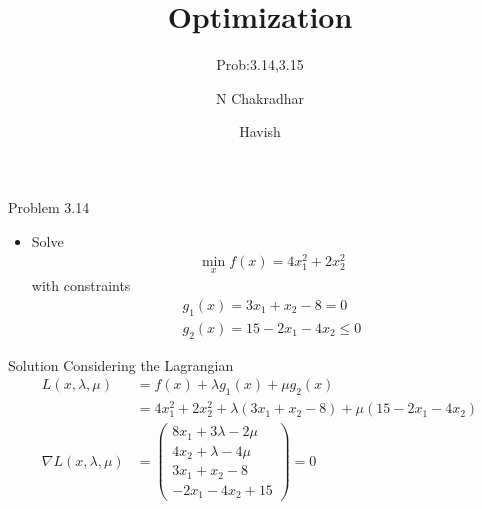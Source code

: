 \documentclass{beamer}
\title{Optimization}
\subtitle{Prob:3.14,3.15}
\author{N Chakradhar\inst{1} \and Havish\inst{2}}
\institute[Universities of Somewhere and Elsewhere] %
{
  \inst{1}%
  EE16BTECH11022
  \and
  \inst{2}%
  EE16BTECH11023}
\begin{document}
\begin{frame}
  \titlepage
\end{frame}




\begin{frame}{Problem 3.14}
  \begin{itemize}
  \item {
Solve
 \begin{align}
\min_x{f(x)} = 4x_1^2 + 2x_2^2
 \end{align}
 with constraints
 \begin{align}
 g_1(x) = 3x_1 + x_2-8 = 0\\
 g_2(x) = 15 - 2x_1 - 4x_2 \leq 0
 \end{align}
  }
  \end{itemize}
\end{frame}

\begin{frame}{Solution}
  Considering the Lagrangian
\begin{align}
L(x,\lambda,\mu) &= f(x) + \lambda g_1(x) + \mu g_2(x) \\
 &= 4x_1^2 + 2x_2^2 + \lambda (3x_1 + x_2-8) + \mu(15 - 2x_1 - 4x_2)\\
 \nabla L(x,\lambda, \mu)  & = 
\begin{pmatrix}
8x_1 + 3 \lambda  -2 \mu  \\
4x_2 + \lambda - 4 \mu \\
3x_1 + x_2 -8 \\
 - 2x_1 - 4x_2 + 15
\end{pmatrix}
= 0
\end{align}
\end{frame}
\end{document}
